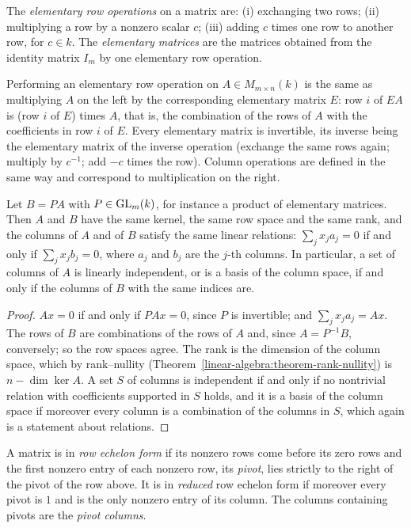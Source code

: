 \begin{definition}\label{linear-algebra:definition-elementary-operations}
The \emph{elementary row operations} on a matrix are: (i) exchanging two rows; (ii) multiplying a row by a nonzero scalar $c$; (iii) adding $c$ times one row to another row, for $c \in k$. The
\emph{elementary matrices} are the matrices obtained from the identity matrix $I_m$ by one elementary row operation.
\end{definition}

Performing an elementary row operation on $A \in M_{m \times n}(k)$ is the same as multiplying $A$ on the left by the corresponding elementary matrix $E$: row $i$ of $EA$ is (row $i$ of $E$) times $A$,
that is, the combination of the rows of $A$ with the coefficients in row $i$ of $E$. Every elementary matrix is invertible, its inverse being the elementary matrix of the inverse operation (exchange
the same rows again; multiply by $c^{-1}$; add $-c$ times the row). Column operations are defined in the same way and correspond to multiplication on the right.

\begin{lemma}\label{linear-algebra:lemma-row-operations}
Let $B = PA$ with $P \in \mathrm{GL}_m(k)$, for instance a product of elementary matrices. Then $A$ and $B$ have the same kernel, the same row space and the same rank, and the columns of $A$ and of $B$ satisfy
the same linear relations: $\sum_jx_ja_j = 0$ if and only if $\sum_jx_jb_j = 0$, where $a_j$ and $b_j$ are the $j$-th columns. In particular, a set of columns of $A$ is linearly independent, or is a basis
of the column space, if and only if the columns of $B$ with the same indices are.
\end{lemma}

\begin{proof}
$Ax = 0$ if and only if $PAx = 0$, since $P$ is invertible; and $\sum_jx_ja_j = Ax$. The rows of $B$ are combinations of the rows of $A$ and, since $A = P^{-1}B$, conversely; so the row spaces agree. The
rank is the dimension of the column space, which by rank--nullity (Theorem~\ref{linear-algebra:theorem-rank-nullity}) is $n - \dim\ker A$. A set $S$ of columns is independent if and only if no
nontrivial relation with coefficients supported in $S$ holds, and it is a basis of the column space if moreover every column is a combination of the columns in $S$, which again is a statement about
relations.
\end{proof}

\begin{definition}\label{linear-algebra:definition-echelon}
A matrix is in \emph{row echelon form} if its nonzero rows come before its zero rows and the first nonzero entry of each nonzero row, its \emph{pivot}, lies strictly to the right of the pivot of the row
above. It is in \emph{reduced} row echelon form if moreover every pivot is $1$ and is the only nonzero entry of its column. The columns containing pivots are the \emph{pivot columns}.
\end{definition}

